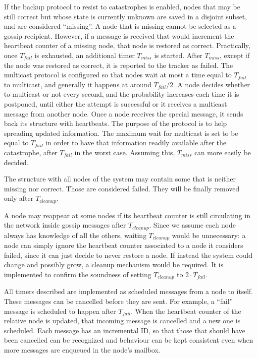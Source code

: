 If the backup protocol to resist to catastrophes is enabled, nodes that may be still correct but whose state is currently unknown are saved in a disjoint subset, and are considered ``missing''.
A node that is missing cannot be selected as a gossip recipient.
However, if a message is received that would increment the heartbeat counter of a missing node, that node is restored as correct.
Practically, once $T_{fail}$ is exhausted, an additional timer $T_{miss}$ is started.
After $T_{miss}$, except if the node was restored as correct, it is reported to the tracker as failed.
The multicast protocol is configured so that nodes wait at most a time equal to $T_{fail}$ to multicast, and generally it happens at around $T_{fail}/2$.
A node decides whether to multicast or not every second, and the probability increases each time it is postponed, until either the attempt is successful or it receives a multicast message from another node.
Once a node receives the special message, it sends back its structure with heartbeats.
The purpose of the protocol is to help spreading updated information.
The maximum wait for multicast is set to be equal to $T_{fail}$ in order to have that information readily available after the catastrophe, after $T_{fail}$ in the worst case.
Assuming this, $T_{miss}$ can more easily be decided.

The structure with all nodes of the system may contain some that is neither missing nor correct.
Those are considered failed.
They will be finally removed only after $T_{cleanup}$.

A node may reappear at some nodes if its heartbeat counter is still circulating in the network inside gossip messages after $T_{cleanup}$.
Since we assume each node always has knowledge of all the others, waiting $T_{cleanup}$ would be unnecessary:
a node can simply ignore the heartbeat counter associated to a node it considers failed, since it can just decide to never restore a node.
If instead the system could change and possibly grow, a cleanup mechanism would be required.
It is implemented to confirm the soundness of setting $T_{cleanup}$ to $2 \cdot T_{fail}$.

All timers described are implemented as scheduled messages from a node to itself.
These messages can be cancelled before they are sent.
For example, a ``fail'' message is scheduled to happen after $T_{fail}$.
When the heartbeat counter of the relative node is updated, that incoming message is cancelled and a new one is scheduled. Each message has an incremental ID, so that those that should have been cancelled can be recognized and behaviour can be kept consistent even when more messages are enqueued in the node's mailbox.


